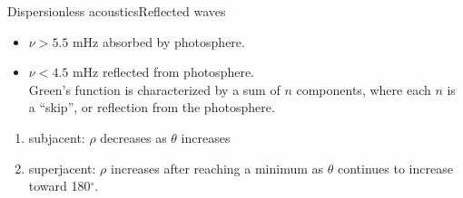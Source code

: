 \documentclass{beamer}
\begin{document}

\begin{frame}{Dispersionless acoustics}{Reflected waves}
    \begin{itemize}
        \item $\nu>5.5$ mHz absorbed by photosphere.
        \item $\nu<4.5$ mHz reflected from photosphere.\\
            Green's function is characterized by a sum of $n$ components, where
            each $n$ is a ``skip'', or reflection from the photosphere.
    \end{itemize}
    \begin{enumerate}
        \item subjacent: $\rho$ decreases as $\theta$ increases
        \item superjacent: $\rho$ increases after reaching a minimum
            as $\theta$ continues to increase toward 180$^{\circ}$.
    \end{enumerate}
\end{frame}
\end{document}
